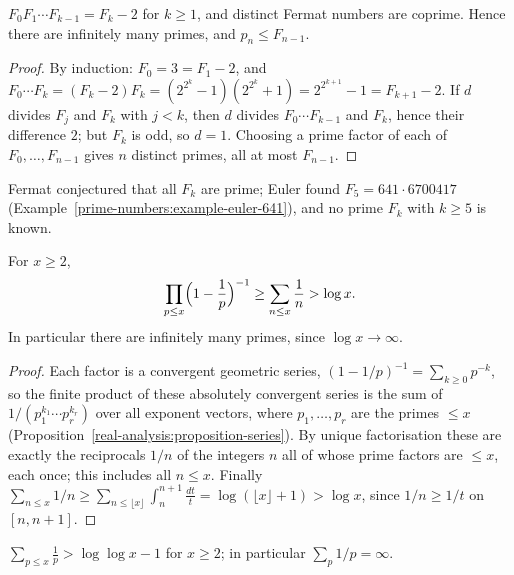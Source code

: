 \begin{proposition}[Goldbach]\label{prime-numbers:proposition-fermat-coprime}
$F_0F_1 \cdots F_{k-1} = F_k - 2$ for $k \geq 1$, and distinct Fermat numbers are coprime. Hence there are infinitely many primes, and $p_n \leq F_{n-1}$.
\end{proposition}

\begin{proof}
By induction: $F_0 = 3 = F_1 - 2$, and $F_0 \cdots F_k = (F_k - 2)F_k = (2^{2^k} - 1)(2^{2^k} + 1) = 2^{2^{k+1}} - 1 = F_{k+1} - 2$. If $d$ divides $F_j$ and $F_k$ with $j < k$, then $d$ divides
$F_0 \cdots F_{k-1}$ and $F_k$, hence their difference $2$; but $F_k$ is odd, so $d = 1$. Choosing a prime factor of each of $F_0, \ldots, F_{n-1}$ gives $n$ distinct primes, all at most
$F_{n-1}$.
\end{proof}

Fermat conjectured that all $F_k$ are prime; Euler found $F_5 = 641 \cdot 6700417$ (Example~\ref{prime-numbers:example-euler-641}), and no prime $F_k$ with $k \geq 5$ is known.

\begin{theorem}[Euler]\label{prime-numbers:theorem-euler-primes}
For $x \geq 2$,
\[
\prod_{p \leq x}\Bigl(1 - \frac{1}{p}\Bigr)^{-1} \geq \sum_{n \leq x}\frac{1}{n} > \log x.
\]
In particular there are infinitely many primes, since $\log x \to \infty$.
\end{theorem}

\begin{proof}
Each factor is a convergent geometric series, $(1 - 1/p)^{-1} = \sum_{k \geq 0}p^{-k}$, so the finite product of these absolutely convergent series is the sum of $1/(p_1^{k_1} \cdots p_r^{k_r})$ over
all exponent vectors, where $p_1, \ldots, p_r$ are the primes $\leq x$ (Proposition~\ref{real-analysis:proposition-series}). By unique factorisation these are exactly the reciprocals $1/n$ of
the integers $n$ all of whose prime factors are $\leq x$, each once; this includes all $n \leq x$. Finally $\sum_{n \leq x}1/n \geq \sum_{n \leq \lfloor x\rfloor}\int_n^{n+1}\frac{dt}{t} =
\log(\lfloor x\rfloor + 1) > \log x$, since $1/n \geq 1/t$ on $[n, n + 1]$.
\end{proof}

\begin{corollary}[Euler]\label{prime-numbers:corollary-reciprocals-diverge}
$\sum_{p \leq x}\frac{1}{p} > \log\log x - 1$ for $x \geq 2$; in particular $\sum_p1/p = \infty$.
\end{corollary}

